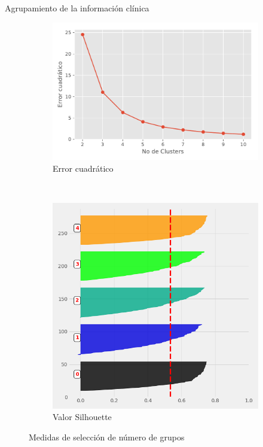 \documentclass[xcolor=dvipsnames]{beamer}
\begin{document}
\begin{frame}{Agrupamiento de la información clínica}
 \begin{figure}
		\centering
		\begin{subfigure}[b]{0.5\textwidth}
			\includegraphics[width=\textwidth]{Clusters.pdf}
			\caption{Error cuadrático}
		\end{subfigure}
		~ %
		\begin{subfigure}[b]{0.35\textwidth}
			\includegraphics[width=\textwidth]{S.png}
			\caption{ Valor Silhouette}
		\end{subfigure}
		\caption{Medidas de selección de número de grupos}
	\end{figure}
\end{frame}
\end{document}
